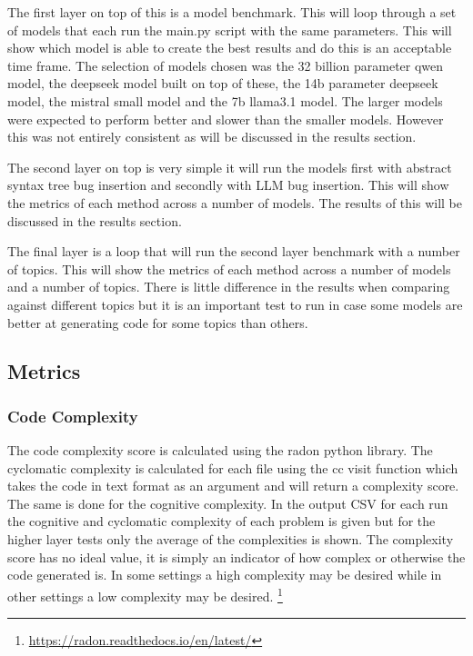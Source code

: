 \documentclass[12pt]{extarticle}
\begin{document}
The first layer on top of this is a model benchmark. This will loop through a set of models that each run the main.py script with the same parameters. This will show which model is able to create the best results and do this is an acceptable time frame. The selection of models chosen was the 32 billion parameter qwen model, the deepseek model built on top of these, the 14b parameter deepseek model, the mistral small model and the 7b llama3.1 model. The larger models were expected to perform better and slower than the smaller models. However this was not entirely consistent as will be discussed in the results section.

The second layer on top is very simple it will run the models first with abstract syntax tree bug insertion and secondly with LLM bug insertion. This will show the metrics of each method across a number of models. The results of this will be discussed in the results section.

The final layer is a loop that will run the second layer benchmark with a number of topics. This will show the metrics of each method across a number of models and a number of topics. There is little difference in the results when comparing against different topics but it is an important test to run in case some models are better at generating code for some topics than others.

\subsection{Metrics}
\subsubsection{Code Complexity}

The code complexity score is calculated using the radon python library. The cyclomatic complexity \cite{esposito2024} is calculated for each file using the cc visit function which takes the code in text format as an argument and will return a complexity score. The same is done for the cognitive complexity. In the output CSV for each run the cognitive and cyclomatic complexity of each problem is given but for the higher layer tests only the average of the complexities is shown. The complexity score has no ideal value, it is simply an indicator of how complex or otherwise the code generated is. In some settings a high complexity may be desired while in other settings a low complexity may be desired.
\footnote{\url{https://radon.readthedocs.io/en/latest/}}
\end{document}
